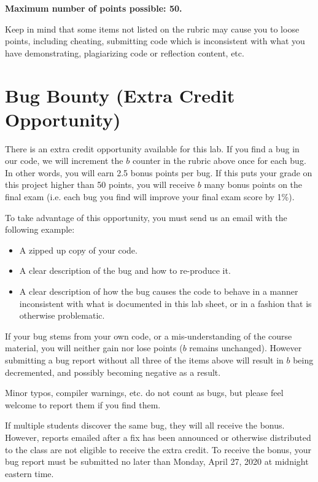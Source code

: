 \documentclass{article}
\begin{document}
\textbf{Maximum number of points possible: 50.}

Keep in mind that some items not listed on the rubric may cause you to loose
points, including cheating, submitting code which is inconsistent with what you
have demonstrating, plagiarizing code or reflection content, etc.

\section{Bug Bounty (Extra Credit Opportunity)}

There is an extra credit opportunity available for this lab. If you find a bug
in our code, we will increment the $b$ counter in the rubric above once for
each bug. In other words, you will earn 2.5 bonus points per bug. If this puts
your grade on this project higher than 50 points, you will receive $b$ many
bonus points on the final exam (i.e. each bug you find will improve your final
exam score by 1\%).

To take advantage of this opportunity, you must send us an email with the
following example:

\begin{itemize}

	\item A zipped up copy of your code.

	\item A clear description of the bug and how to re-produce it.

	\item A clear description of how the bug causes the code to behave in a
		manner inconsistent with what is documented in this lab sheet,
		or in a fashion that is otherwise problematic.

\end{itemize}

If your bug stems from your own code, or a mis-understanding of the course
material, you will neither gain nor lose points ($b$ remains unchanged).
However submitting a bug report without all three of the items above will
result in $b$ being decremented, and possibly becoming negative as a result.

Minor typos, compiler warnings, etc. do not count as bugs, but please feel
welcome to report them if you find them.

If multiple students discover the same bug, they will all receive the bonus.
However, reports emailed after a fix has been announced or otherwise
distributed to the class are not eligible to receive the extra credit. To
receive the bonus, your bug report must be submitted no later than Monday,
April 27, 2020 at midnight eastern time.
\end{document}
